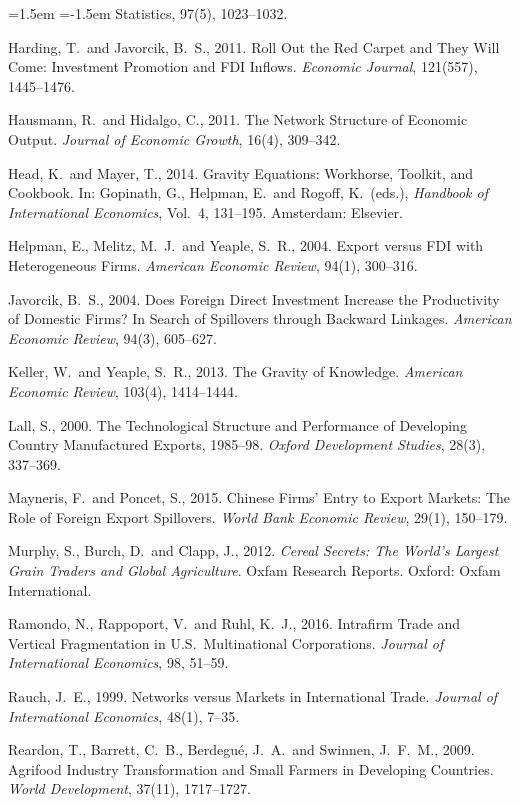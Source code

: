 \begin{list}{}{\leftmargin=1.5em \itemindent=-1.5em \itemsep=2pt \topsep=4pt}
{Statistics}, 97(5), 1023--1032.
\item Harding, T.\ and Javorcik, B.\ S., 2011. Roll Out the Red Carpet and They Will Come:
Investment Promotion and FDI Inflows. \emph{Economic Journal}, 121(557), 1445--1476.
\item Hausmann, R.\ and Hidalgo, C., 2011. The Network Structure of Economic Output.
\emph{Journal of Economic Growth}, 16(4), 309--342.
\item Head, K.\ and Mayer, T., 2014. Gravity Equations: Workhorse, Toolkit, and Cookbook. In:
Gopinath, G., Helpman, E.\ and Rogoff, K.\ (eds.), \emph{Handbook of International Economics},
Vol.\ 4, 131--195. Amsterdam: Elsevier.
\item Helpman, E., Melitz, M.\ J.\ and Yeaple, S.\ R., 2004. Export versus FDI with Heterogeneous
Firms. \emph{American Economic Review}, 94(1), 300--316.
\item Javorcik, B.\ S., 2004. Does Foreign Direct Investment Increase the Productivity of Domestic
Firms? In Search of Spillovers through Backward Linkages. \emph{American Economic Review}, 94(3),
605--627.
\item Keller, W.\ and Yeaple, S.\ R., 2013. The Gravity of Knowledge. \emph{American Economic
Review}, 103(4), 1414--1444.
\item Lall, S., 2000. The Technological Structure and Performance of Developing Country
Manufactured Exports, 1985--98. \emph{Oxford Development Studies}, 28(3), 337--369.
\item Mayneris, F.\ and Poncet, S., 2015. Chinese Firms' Entry to Export Markets: The Role of
Foreign Export Spillovers. \emph{World Bank Economic Review}, 29(1), 150--179.
\item Murphy, S., Burch, D.\ and Clapp, J., 2012. \emph{Cereal Secrets: The World's Largest Grain
Traders and Global Agriculture}. Oxfam Research Reports. Oxford: Oxfam International.
\item Ramondo, N., Rappoport, V.\ and Ruhl, K.\ J., 2016. Intrafirm Trade and Vertical
Fragmentation in U.S.\ Multinational Corporations. \emph{Journal of International Economics}, 98,
51--59.
\item Rauch, J.\ E., 1999. Networks versus Markets in International Trade. \emph{Journal of
International Economics}, 48(1), 7--35.
\item Reardon, T., Barrett, C.\ B., Berdegu\'e, J.\ A.\ and Swinnen, J.\ F.\ M., 2009. Agrifood
Industry Transformation and Small Farmers in Developing Countries. \emph{World Development}, 37(11),
1717--1727.

\end{list}

